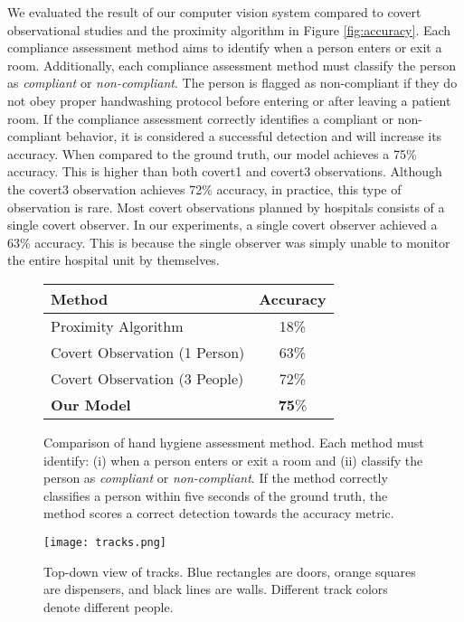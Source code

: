 \documentclass[twoside,11pt]{article}
\begin{document}
We evaluated the result of our computer vision system compared to covert observational studies and the proximity algorithm in Figure \ref{fig:accuracy}.
Each compliance assessment method aims to identify when a person enters or exit a room.
Additionally, each compliance assessment method must classify the person as \textit{compliant} or \textit{non-compliant}.
The person is flagged as non-compliant if they do not obey proper handwashing protocol before entering or after leaving a patient room.
If the compliance assessment correctly identifies a compliant or non-compliant behavior, it is considered a successful detection and will increase its accuracy.
When compared to the ground truth, our model achieves a 75\% accuracy.
This is higher than both covert1 and covert3 observations. Although the covert3 observation achieves 72\% accuracy, in practice, this type of observation is rare.
Most covert observations planned by hospitals consists of a single covert observer.
In our experiments, a single covert observer achieved a 63\% accuracy.
This is because the single observer was simply unable to monitor the entire hospital unit by themselves.

\begin{figure*}[t]
\vspace{-8mm}
	\begin{minipage}{.47\linewidth}
		\centering
		\small
		\begin{tabular}{l|c} \toprule
			Method & Accuracy \\ \midrule
			Proximity Algorithm & 18\% \\
			Covert Observation (1 Person) & 63\% \\
			Covert Observation (3 People) & 72\% \\ \midrule
			\textbf{Our Model} & \textbf{75}\% \\
			\bottomrule
		\end{tabular}
		\caption{Comparison of hand hygiene assessment method. Each method must identify: (i) when a person enters or exit a room and (ii) classify the person as \textit{compliant} or \textit{non-compliant}. If the method correctly classifies a person within five seconds of the ground truth, the method scores a correct detection towards the accuracy metric.}\label{fig:accuracy}
	\end{minipage}%
	\hspace{3mm}
	\begin{minipage}{.51\linewidth}
		\centering
		\texttt{[image: tracks.png]}
		\caption{Top-down view of tracks. Blue rectangles are doors, orange squares are dispensers, and black lines are walls. Different track colors denote different people.}
		\label{fig:tracks}
	\end{minipage} 
\end{figure*}
\end{document}
